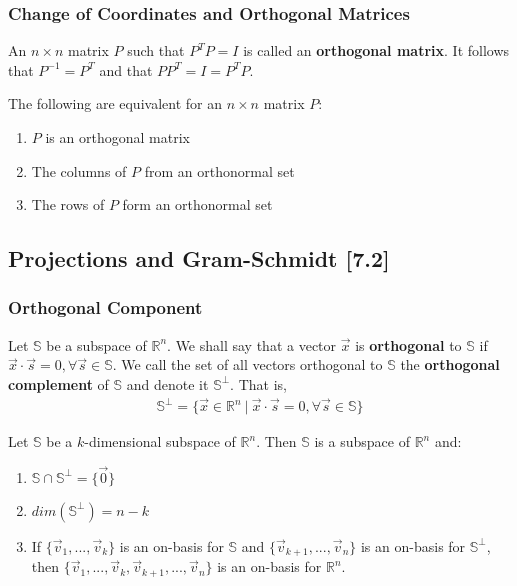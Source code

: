 \documentclass[a4paper,9pt]{extarticle}
\begin{document}
\begin{multicols*}{2}

\subsubsection{Change of Coordinates and Orthogonal Matrices}
An $n \times n$ matrix $P$ such that $P^T P = I$ is called an \textbf{orthogonal matrix}. It follows that $P^{-1} = P^T$ and that $P P^T = I = P^T P$.

The following are equivalent for an $n \times n$ matrix $P$:
\begin{enumerate}[label=\bfseries (\arabic*)] \itemsep0pt \parskip0pt 
    \item $P$ is an orthogonal matrix
    \item The columns of $P$ from an orthonormal set
    \item The rows of $P$ form an orthonormal set
\end{enumerate}


\subsection{Projections and Gram-Schmidt [7.2]}


\subsubsection{Orthogonal Component}
Let $\mathbb{S}$ be a subspace of $\mathbb{R}^n$. We shall say that a vector $\vec{x}$ is \textbf{orthogonal} to $\mathbb{S}$ if $\vec{x} \cdot \vec{s} = 0, \forall \vec{s} \in \mathbb{S}$. We call the set of all vectors orthogonal to $\mathbb{S}$ the \textbf{orthogonal complement} of $\mathbb{S}$ and denote it $\mathbb{S}^\bot$. That is,
\begin{equation} \label{7.2-1}
    \begin{split}
        \mathbb{S}^\bot = \{\vec{x} \in \mathbb{R}^n \> | \> \vec{x} \cdot \vec{s} = 0, \forall \vec{s} \in \mathbb{S}\}
    \end{split}
\end{equation}

Let $\mathbb{S}$ be a $k$-dimensional subspace of $\mathbb{R}^n$. Then $\mathbb{S}$ is a subspace of $\mathbb{R}^n$ and:
\begin{enumerate}[label=\bfseries (\arabic*)] \itemsep0pt \parskip0pt 
    \item $\mathbb{S} \cap \mathbb{S}^\bot = \{\vec{0}\}$
    \item $dim(\mathbb{S}^\bot) = n - k$
    \item If $\{\vec{v}_1, ..., \vec{v}_k\}$ is an on-basis for $\mathbb{S}$ and $\{\vec{v}_{k + 1}, ..., \vec{v}_n\}$ is an on-basis for $\mathbb{S}^\bot$, then $\{\vec{v}_1, ..., \vec{v}_k, \vec{v}_{k + 1}, ..., \vec{v}_n\}$ is an on-basis for $\mathbb{R}^n$.
\end{enumerate}


\end{multicols*}
\end{document}
